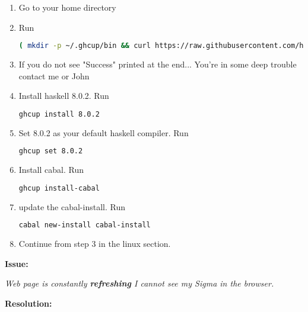 \documentclass{article}
\begin{document}
        \begin{enumerate}
             
        \item Go to your home directory
        \item Run
                 \begin{lstlisting}[language=Bash]
                 ( mkdir -p ~/.ghcup/bin && curl https://raw.githubusercontent.com/haskell/ghcup/master/ghcup > ~/.ghcup/bin/ghcup && chmod +x ~/.ghcup/bin/ghcup) && echo "Success"
\end{lstlisting}
        \item If you do not see "Success" printed at the end... You're in some deep trouble contact me or John
        \item Install haskell 8.0.2. Run 
                 \begin{lstlisting}[language=Bash]
                 ghcup install 8.0.2
\end{lstlisting}
        \item Set 8.0.2 as your default haskell compiler. Run
         \begin{lstlisting}[language=Bash]
         ghcup set 8.0.2
\end{lstlisting}
        
        \item Install cabal. Run
         \begin{lstlisting}[language=Bash]
         ghcup install-cabal
\end{lstlisting}

        \item update the cabal-install. Run
         \begin{lstlisting}[language=Bash]
         cabal new-install cabal-install
\end{lstlisting}

        \item Continue from step 3 in the linux section.
        \end{enumerate}

 \textbf{Issue:}
 
 \textit{Web page is constantly \textbf{refreshing} I cannot see my Sigma in the browser.}
 
 \textbf{Resolution:}
 
\end{document}
